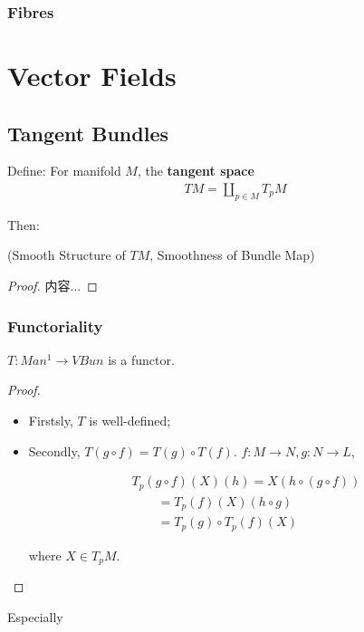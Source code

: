 \documentclass[Total.tex]{subfiles}
\begin{document}
			\subsection{Fibres}
				
		
	\chapter{Vector Fields}
		\section{Tangent Bundles}
			\begin{Def}
				Define: For manifold $M$, the \textbf{tangent space}
				\begin{gather*}
					T M=\coprod_{p\in M} T_p M
				\end{gather*}
			\end{Def}
			Then:
			\begin{proposition}
				(Smooth Structure of $TM$, Smoothness of Bundle Map)
			\end{proposition}
			\begin{proof}
				内容...
			\end{proof}
			\subsection{Functoriality}
			
			\begin{proposition}
				$T:Man^1\rightarrow VBun$ is a functor. 
			\end{proposition}
			\begin{proof}
				\begin{itemize}
					\item Firstsly, $T$ is well-defined;
					\item Secondly, $T(g\circ f)=T(g)\circ T(f)$. $f:M\rightarrow N,g:N\rightarrow L$,
					
					\begin{gather*}
						T_p(g\circ f)(X)(h)=X(h\circ (g\circ f))\\
						\qquad =T_p(f)(X)(h\circ g)\\
						\qquad =T_p(g)\circ T_p(f)(X)
					\end{gather*}
					
					where $X\in T_p M$. 
				\end{itemize}
			\end{proof}
			
			Especially
			
\end{document}
